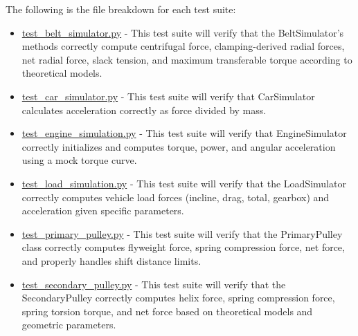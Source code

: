 \documentclass[12pt, titlepage]{article}
\begin{document}
\noindent The following is the file breakdown for each test suite:
\begin{itemize}
  \item \href{https://github.com/gr812b/CVT-Simulator/blob/main/test/simulations/test_belt_simulator.py}{test\_belt\_simulator.py} 
  \label{test:belt_simulator} - This test suite will verify that the BeltSimulator’s methods correctly compute centrifugal force, clamping-derived radial forces, net radial force, slack tension, and maximum transferable torque according to theoretical models.

  \item \href{https://github.com/gr812b/CVT-Simulator/blob/main/test/simulations/test_car_simulation.py}{test\_car\_simulator.py} 
  \label{test:car_simulator} - This test suite will verify that CarSimulator calculates acceleration correctly as force divided by mass.

  \item \href{https://github.com/gr812b/CVT-Simulator/blob/main/test/simulations/test_engine_simulation.py}{test\_engine\_simulation.py} 
  \label{test:engine_simulator} - This test suite will verify that EngineSimulator correctly initializes and computes torque, power, and angular acceleration using a mock torque curve.

  \item \href{https://github.com/gr812b/CVT-Simulator/blob/main/test/simulations/test_load_simulation.py}{test\_load\_simulation.py} 
  \label{test:load_simulator} - This test suite will verify that the LoadSimulator correctly computes vehicle load forces (incline, drag, total, gearbox) and acceleration given specific parameters.

  \item \href{https://github.com/gr812b/CVT-Simulator/blob/main/test/simulations/test_primary_pulley.py}{test\_primary\_pulley.py} 
  \label{test:primary_pulley} - This test suite will verify that the PrimaryPulley class correctly computes flyweight force, spring compression force, net force, and properly handles shift distance limits.

  \item \href{https://github.com/gr812b/CVT-Simulator/blob/main/test/simulations/test_secondary_pulley.py}{test\_secondary\_pulley.py}
  \label{test:secondary_pulley} - This test suite will verify that the SecondaryPulley correctly computes helix force, spring compression force, spring torsion torque, and net force based on theoretical models and geometric parameters.


\end{itemize}
\end{document}
